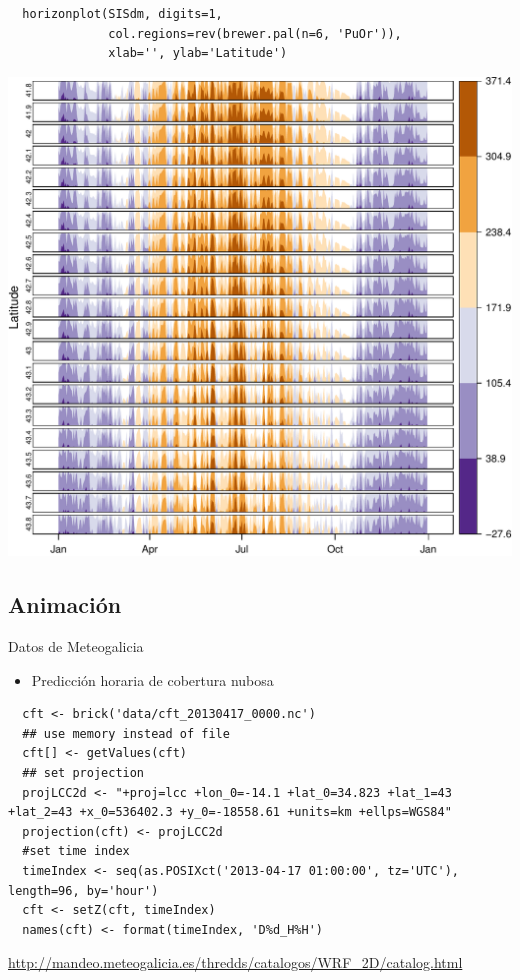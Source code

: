 \documentclass[xcolor={usenames,svgnames,dvipsnames}]{beamer}
\begin{document}
\begin{frame}[fragile,label=sec-4-4-3]{}
 \lstset{language=R,label= ,caption= ,numbers=none}
\begin{lstlisting}
  horizonplot(SISdm, digits=1,
              col.regions=rev(brewer.pal(n=6, 'PuOr')),
              xlab='', ylab='Latitude')
\end{lstlisting}

\includegraphics[width=.9\linewidth]{figs/SISdm_horizonplot.pdf}
\end{frame}


\subsection{Animación}
\label{sec-4-5}

\begin{frame}[fragile,label=sec-4-5-1]{Datos de Meteogalicia}
 \begin{itemize}
\item Predicción horaria de cobertura nubosa
\end{itemize}
\lstset{language=R,label= ,caption= ,numbers=none}
\begin{lstlisting}
  cft <- brick('data/cft_20130417_0000.nc')
  ## use memory instead of file
  cft[] <- getValues(cft)
  ## set projection
  projLCC2d <- "+proj=lcc +lon_0=-14.1 +lat_0=34.823 +lat_1=43 +lat_2=43 +x_0=536402.3 +y_0=-18558.61 +units=km +ellps=WGS84"
  projection(cft) <- projLCC2d
  #set time index
  timeIndex <- seq(as.POSIXct('2013-04-17 01:00:00', tz='UTC'), length=96, by='hour')
  cft <- setZ(cft, timeIndex)
  names(cft) <- format(timeIndex, 'D%d_H%H')
\end{lstlisting}

\url{http://mandeo.meteogalicia.es/thredds/catalogos/WRF_2D/catalog.html}
\end{frame}
\end{document}
